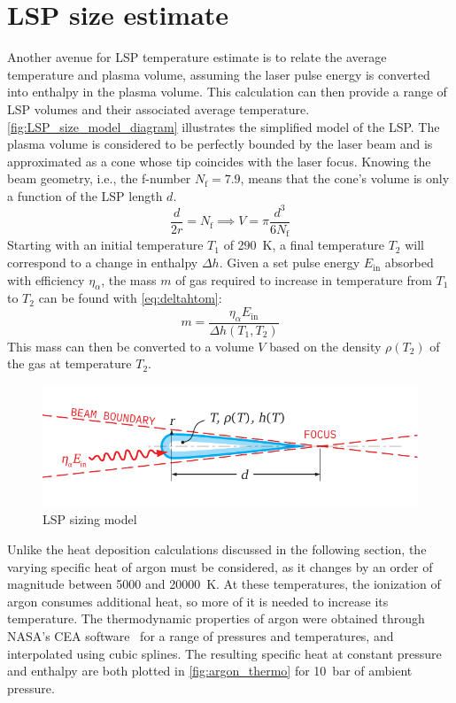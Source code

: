    \section{LSP size estimate}
        Another avenue for LSP temperature estimate is to relate the average temperature and plasma volume, assuming the laser pulse energy is converted into enthalpy in the plasma volume. This calculation can then provide a range of LSP volumes and their associated average temperature. \autoref{fig:LSP_size_model_diagram} illustrates the simplified model of the LSP. The plasma volume is considered to be perfectly bounded by the laser beam and is approximated as a cone whose tip coincides with the laser focus. Knowing the beam geometry, i.e., the f-number $N_\mathrm{f} = 7.9$, means that the cone's volume is only a function of the LSP length $d$.
        \begin{equation}
            \frac{d}{2r} = N_\mathrm{f} \implies V = \pi\frac{d^3}{6N_\mathrm{f}}
        \end{equation}
        Starting with an initial temperature $T_1$ of \qty{290}{K}, a final temperature $T_2$ will correspond to a change in enthalpy $\Delta h$. Given a set pulse energy $E_\mathrm{in}$ absorbed with efficiency $\eta_\alpha$, the mass $m$ of gas required to increase in temperature from $T_1$ to $T_2$ can be found with \autoref{eq:deltahtom}:
        \begin{equation}
            m = \frac{\eta_\alpha E_\mathrm{in}}{\Delta h(T_1, T_2)} \label{eq:deltahtom}
        \end{equation}
        This mass can then be converted to a volume $V$ based on the density $\rho(T_2)$ of the gas at temperature $T_2$.

        \begin{figure}[h]
            \centering
            \includegraphics[]{assets/4 models/LSP_sizemodel.pdf}
            \caption{LSP sizing model}
            \label{fig:LSP_size_model_diagram}
        \end{figure}

        Unlike the heat deposition calculations discussed in the following section, the varying specific heat of argon must be considered, as it changes by an order of magnitude between 5000 and \qty{20000}{K}. At these temperatures, the ionization of argon consumes additional heat, so more of it is needed to increase its temperature. The thermodynamic properties of argon were obtained through NASA's CEA software~\cite{gordonComputerProgramCalculation1994} for a range of pressures and temperatures, and interpolated using cubic splines. The resulting specific heat at constant pressure and enthalpy are both plotted in \autoref{fig:argon_thermo} for \qty{10}{bar} of ambient pressure.

